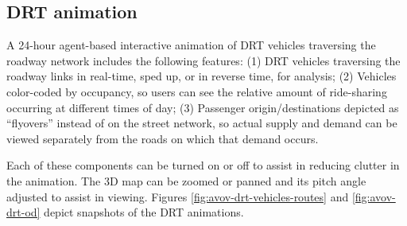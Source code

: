 \subsection{DRT animation}

A 24-hour agent-based interactive animation of DRT vehicles traversing the roadway network includes the following features: (1) DRT vehicles traversing the roadway links in real-time, sped up, or in reverse time, for analysis; (2) Vehicles color-coded by occupancy, so users can see the relative amount of ride-sharing occurring at different times of day; (3) Passenger origin/destinations depicted as ``flyovers'' instead of on the street network, so actual supply and demand can be viewed separately from the roads on which that demand occurs.

Each of these components can be turned on or off to assist in reducing clutter in the animation. The 3D map can be zoomed or panned and its pitch angle adjusted to assist in viewing. Figures \ref{fig:avov-drt-vehicles-routes} and \ref{fig:avov-drt-od} depict snapshots of the DRT animations.

